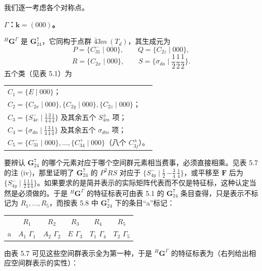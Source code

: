 我们逐一考虑各个对称点。

\noindent\textbf{$\Gamma$：$\mathbf{k} = (000)$。}

${}^{H}\mathbf{G}^{\Gamma}$ 是 $\mathbf{G}^{7}_{24}$，它同构于点群 $\bar{4}3m\ (T_{d})$，其生成元为
\begin{equation*}
P = \{C^{-}_{31} \mid 000\}, \qquad Q = \{C_{2z} \mid 000\},
\end{equation*}
\begin{equation*}
R = \{C_{2x} \mid 000\}, \qquad S = \{\sigma_{da} \mid {\textstyle\frac{1}{2}}{\textstyle\frac{1}{2}}{\textstyle\frac{1}{2}}\}.
\end{equation*}
五个类（见表 5.1）为
\begin{center}
\begin{tabular}{l}
$C_{1} = \{E \mid 000\}$；\\
$C_{2} = \{C_{2x} \mid 000\}, \{C_{2y} \mid 000\}, \{C_{2z} \mid 000\}$；\\
$C_{3} = \{S^{-}_{4x} \mid {\frac{1}{4}}{\frac{3}{4}}{\frac{1}{4}}\}$ 及其余五个 $S^{\pm}_{4m}$ 项；\\
$C_{4} = \{\sigma_{da} \mid {\frac{1}{4}}{\frac{3}{4}}{\frac{1}{4}}\}$ 及其余五个 $\sigma_{dm}$ 项；\\
$C_{5} = \{C^{-}_{31} \mid 000\}, \dots, \{C^{+}_{34} \mid 000\}$（八个 $C^{\pm}_{3j}$）。
\end{tabular}
\end{center}
要辨认 $\mathbf{G}^{7}_{24}$ 的哪个元素对应于哪个空间群元素相当费事，必须直接相乘。见表 5.7 的注 (iv)，那里证明了 $\mathbf{G}^{7}_{24}$ 的 $P^{2}RS$ 对应于 $\{S^{-}_{4y} \mid {\frac{1}{2}}\,{-\frac{3}{4}}\,{\frac{1}{4}}\}$，或平移至 $\mathbf{F}$ 后为 $\{S^{-}_{4y} \mid {\frac{1}{2}}{\frac{1}{4}}{\frac{1}{4}}\}$。如果要求的是简并表示的实际矩阵代表而不仅是特征标，这种认定当然是必须做的。于是 ${}^{H}\mathbf{G}^{\Gamma}$ 的特征标表可由表 5.1 的 $\mathbf{G}^{7}_{24}$ 条目查得，只是表示不标记为 $R_{1}, \dots, R_{5}$，而按表 5.8 中 $\mathbf{G}^{7}_{24}$ 下的条目“a”标记：
\begin{center}
\begin{tabular}{lccccc}
 & $R_{1}$ & $R_{2}$ & $R_{3}$ & $R_{4}$ & $R_{5}$\\
a & $A_{1}$ $\Gamma_{1}$ & $A_{2}$ $\Gamma_{2}$ & $E$ $\Gamma_{3}$ & $T_{1}$ $\Gamma_{4}$ & $T_{2}$ $\Gamma_{5}$
\end{tabular}
\end{center}
由表 5.7 可见这些空间群表示全为第一种，于是 ${}^{H}\mathbf{G}^{\Gamma}$ 的特征标表为（右列给出相应空间群表示的实性）：
